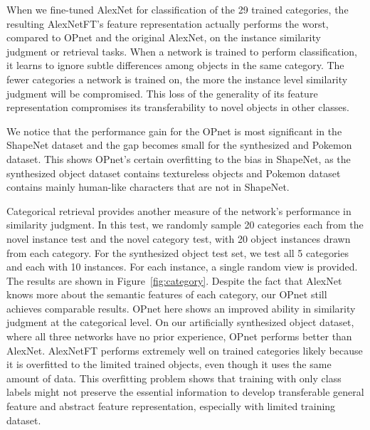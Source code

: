 \documentclass{article} %
\begin{document}
When we fine-tuned AlexNet for classification of the 29 trained categories, the resulting AlexNetFT's feature representation actually performs the worst, compared to OPnet and the original AlexNet, on the instance similarity judgment or retrieval tasks. When a network is trained to perform classification, it learns to ignore subtle differences among objects in the same category. The fewer categories a network is trained on, the more the instance level similarity judgment will be compromised. This loss of the generality of its feature representation compromises its transferability to novel objects in other classes.

We notice that the performance gain for the OPnet is most significant in the ShapeNet dataset and the gap becomes small for the synthesized and Pokemon dataset. This shows OPnet's certain overfitting to the bias in ShapeNet, as the synthesized object dataset contains textureless objects and Pokemon dataset contains mainly human-like characters that are not in ShapeNet.

Categorical retrieval provides another measure of the network's performance in similarity judgment. In this test, we randomly sample 20 categories each from the novel instance test and the novel category test, with 20 object instances drawn from each category. For the synthesized object test set, we test all 5 categories and each with 10 instances. For each instance, a single random view is provided. The results are shown in Figure~\ref{fig:category}. Despite the fact that AlexNet knows more about the semantic features of each category, our OPnet still achieves comparable results. OPnet here shows an improved ability in similarity judgment at the categorical level. On our artificially synthesized object dataset, where all three networks have no prior experience, OPnet performs better than AlexNet. AlexNetFT performs extremely well on trained categories likely because it is overfitted to the limited trained objects, even though it uses the same amount of data. This overfitting problem shows that training with only class labels might not preserve the essential information to develop transferable general feature and abstract feature representation, especially with limited training dataset.
\end{document}
